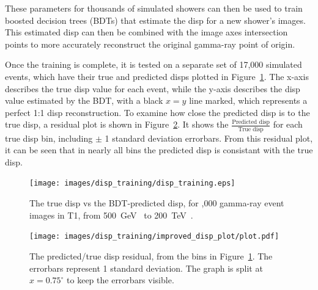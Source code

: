     These parameters for thousands of simulated showers can then be used to train boosted decision trees (BDTs) that estimate the disp for a new shower's images.
    This estimated disp can then be combined with the image axes intersection points to more accurately reconstruct the original gamma-ray point of origin.
    
    Once the training is complete, it is tested on a separate set of 17,000 simulated events, which have their true and predicted disps plotted in Figure~\ref{fig:disptraining}.
    The x-axis describes the true disp value for each event, while the y-axis describes the disp value estimated by the BDT, with a black $x=y$ line marked, which represents a perfect 1:1 disp reconstruction.
    To examine how close the predicted disp is to the true disp, a residual plot is shown in Figure~\ref{fig:dispresidual}.
    It shows the $\frac{\textrm{Predicted disp}}{\textrm{True disp}}$ for each true disp bin, including $\pm$ 1 standard deviation errorbars.
    From this residual plot, it can be seen that in nearly all bins the predicted disp is consistant with the true disp.

    \begin{figure}[b]
      \centering
      \texttt{[image: images/disp\_training/disp\_training.eps]}
      \caption[Disp BDT Training]{
        The true disp vs the BDT-predicted disp, for ,000 gamma-ray event images in T1, from \SI{500}{\GeV{}} to \SI{200}{\TeV{}}.
      }
      \label{fig:disptraining}
    \end{figure}
    
    \begin{figure}[t]
      \centering
      \texttt{[image: images/disp\_training/improved\_disp\_plot/plot.pdf]}
      \caption[Disp BDT Residual]{
        The predicted/true disp residual, from the bins in Figure~\ref{fig:disptraining}.
        The errorbars represent 1 standard deviation.
        The graph is split at $x=0.75^{\circ}$ to keep the errorbars visible.
      }
      \label{fig:dispresidual}
    \end{figure}

